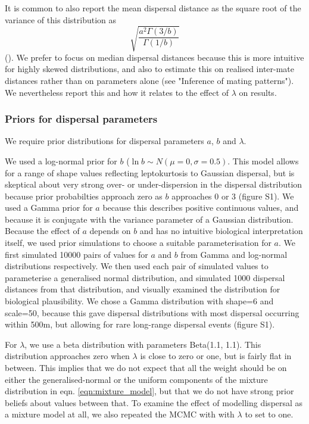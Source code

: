 \documentclass[10pt, a4paper, twocolumn]{article} %
\begin{document}
It is common to also report the mean dispersal distance as the square root of the variance of this distribution as
\begin{equation}
\label{eqn:sd_GND}    
\sqrt{ \frac{ a^2 \Gamma(3/b) }{ \Gamma(1/b) } }
\end{equation}
(\cite{Nadarajah2005}).
We prefer to focus on median dispersal distances because this is more intuitive for highly skewed distributions, and also to estimate this on realised inter-mate distances rather than on parameters alone (see "Inference of mating patterns"). We nevertheless report this and how it relates to the effect of $\lambda$ on results.

\subsubsection{Priors for dispersal parameters}

We require prior distributions for dispersal parameters $a$, $b$ and $\lambda$.

We used a log-normal prior for $b$ ($\ln b \sim N(\mu=0, \sigma = 0.5)$.
This model allows for a range of shape values reflecting leptokurtosis to Gaussian dispersal, but is skeptical about very strong over- or under-dispersion in the dispersal distribution because prior probabilties approach zero as $b$ approaches 0 or 3 (figure S1).
We used a Gamma prior for $a$ because this describes positive continuous values, and because it is conjugate with the variance parameter of a Gaussian distribution.
Because the effect of $a$ depends on $b$ and has no intuitive biological interpretation itself, we used prior simulations to choose a suitable parameterisation for $a$. We first simulated 10000 pairs of values for $a$ and $b$ from Gamma and log-normal distributions respectively. We then used each pair of simulated values to parameterise a generalised normal distribution, and simulated 1000 dispersal distances from that distribution, and visually examined the distribution for biological plausibility. We chose a Gamma distribution with shape=6 and scale=50, because this gave dispersal distributions with most dispersal occurring within 500m, but allowing for rare long-range dispersal events (figure S1).

For $\lambda$, we use a beta distribution with parameters Beta(1.1, 1.1).
This distribution approaches zero when $\lambda$ is close to zero or one, but is fairly flat in between.
This implies that we do not expect that all the weight should be on either the generalised-normal or the uniform components of the mixture distribution in eqn. \ref{eqn:mixture_model}, but that we do not have strong prior beliefs about values between that.
To examine the effect of modelling dispersal as a mixture model at all, we also repeated the MCMC with with $\lambda$ to set to one.
\end{document}
